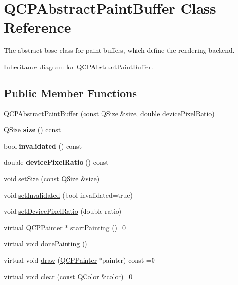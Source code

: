 \hypertarget{classQCPAbstractPaintBuffer}{}\section{Q\+C\+P\+Abstract\+Paint\+Buffer Class Reference}
\label{classQCPAbstractPaintBuffer}


The abstract base class for paint buffers, which define the rendering backend.  




Inheritance diagram for Q\+C\+P\+Abstract\+Paint\+Buffer\+:
\subsection*{Public Member Functions}
\begin{DoxyCompactItemize}
\item 
\hyperlink{classQCPAbstractPaintBuffer_a3ce532c12f10b81697108835755641e2}{Q\+C\+P\+Abstract\+Paint\+Buffer} (const Q\+Size \&size, double device\+Pixel\+Ratio)
\item 
\mbox{\label{classQCPAbstractPaintBuffer_a3ea8284e547985c5d263f26a6adfa11f}} 
Q\+Size {\bfseries size} () const
\item 
\mbox{\label{classQCPAbstractPaintBuffer_a76bf771cda945a6c602cf9b7d365d92b}} 
bool {\bfseries invalidated} () const
\item 
\mbox{\label{classQCPAbstractPaintBuffer_aac1b981f8c1744036610ff1a6b9461f9}} 
double {\bfseries device\+Pixel\+Ratio} () const
\item 
void \hyperlink{classQCPAbstractPaintBuffer_a8b68c3cd36533f1a4a23b5ce8cd66f01}{set\+Size} (const Q\+Size \&size)
\item 
void \hyperlink{classQCPAbstractPaintBuffer_ae4c7dc70dfc66be2879ce297b2b3d67f}{set\+Invalidated} (bool invalidated=true)
\item 
void \hyperlink{classQCPAbstractPaintBuffer_a555eaad5d5c806420ff35602a1bb68fa}{set\+Device\+Pixel\+Ratio} (double ratio)
\item 
virtual \hyperlink{classQCPPainter}{Q\+C\+P\+Painter} $\ast$ \hyperlink{classQCPAbstractPaintBuffer_a9e9f29b19c033cf02fb96f1a148463f3}{start\+Painting} ()=0
\item 
virtual void \hyperlink{classQCPAbstractPaintBuffer_a41b0dc6e7744f19fae09f8532c207dc1}{done\+Painting} ()
\item 
virtual void \hyperlink{classQCPAbstractPaintBuffer_afb998c7525e3ae37d9d2d46c7aaf461a}{draw} (\hyperlink{classQCPPainter}{Q\+C\+P\+Painter} $\ast$painter) const =0
\item 
virtual void \hyperlink{classQCPAbstractPaintBuffer_a9e253f4541dfc01992b77e8830bd7722}{clear} (const Q\+Color \&color)=0
\end{DoxyCompactItemize}
